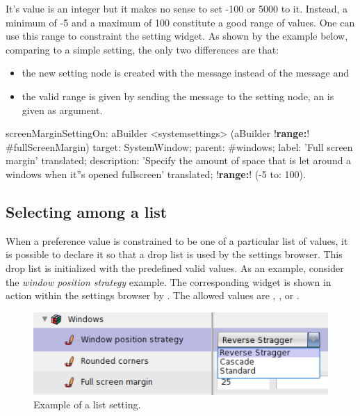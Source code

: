 \documentclass[a4paper,10pt,twoside]{book}
\begin{document}
It's value is an integer but it makes no sense to set -100 or 5000 to it. 
Instead, a minimum of -5 and a maximum of 100 constitute a good range of values. One can use this range to constraint the setting widget. As shown by the example below, comparing to a simple setting, the only two differences are that:
\begin{itemize}
\item 
	the new setting node is created with the  message instead of the  message and
\item	the valid range is given by sending the  message to the  setting node, an  is given as argument.
\end{itemize}

\begin{code}{}
screenMarginSettingOn: aBuilder
	<systemsettings>
	(aBuilder !\textbf{range:}! #fullScreenMargin)
		target: SystemWindow;
		parent: #windows;
		label: 'Full screen margin' translated;
		description: 'Specify the amount of space that is let around a windows when it''s opened fullscreen' translated;
		!\textbf{range:}! (-5 to: 100).
\end{code}

\subsection{Selecting among a list}
When a preference value is constrained to be one of a particular list of values, it is possible to declare it so that a drop list is used by the settings browser. This drop list is initialized with the predefined valid values. As an example, consider the \textit{window position strategy} example. The corresponding widget is shown in action within the settings browser by . The allowed values are , , or .

\begin{figure}[tbh]
\begin{center}
\includegraphics[scale=0.38]{window-position-strategy}
\caption{Example of a list setting.}
\end{center}
\end{figure}
\end{document}
